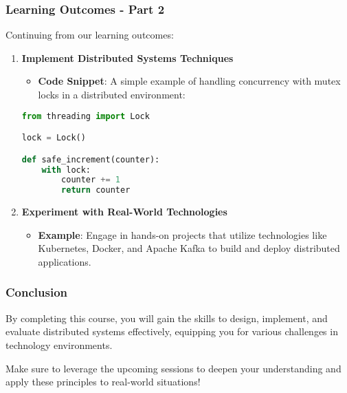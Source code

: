 \documentclass[aspectratio=169]{beamer}
\begin{document}
\begin{frame}[fragile]
    \frametitle{Learning Outcomes - Part 2}
    Continuing from our learning outcomes:
    \begin{enumerate}[resume]
        \item \textbf{Implement Distributed Systems Techniques}
            \begin{itemize}
                \item \textbf{Code Snippet}: A simple example of handling concurrency with mutex locks in a distributed environment:
            \end{itemize}
            \begin{lstlisting}[language=Python]
from threading import Lock

lock = Lock()

def safe_increment(counter):
    with lock:
        counter += 1
        return counter
            \end{lstlisting}

        \item \textbf{Experiment with Real-World Technologies}
            \begin{itemize}
                \item \textbf{Example}: Engage in hands-on projects that utilize technologies like Kubernetes, Docker, and Apache Kafka to build and deploy distributed applications.
            \end{itemize}
    \end{enumerate}
\end{frame}

\begin{frame}[fragile]
    \frametitle{Conclusion}
    By completing this course, you will gain the skills to design, implement, and evaluate distributed systems effectively, equipping you for various challenges in technology environments.
    
    Make sure to leverage the upcoming sessions to deepen your understanding and apply these principles to real-world situations!
\end{frame}
\end{document}
